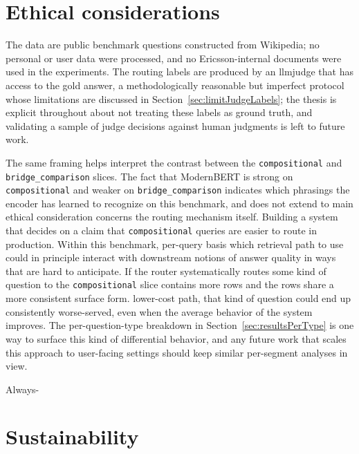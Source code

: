 \documentclass[english, bibtex]{kththesis}               %
\numberwithin{listing}{chapter}
\providecommand{\DIFaddtex}[1]{{\protect\color{blue} \sf #1}} %
\providecommand{\DIFdeltex}[1]{{\protect\color{red} \scriptsize #1}} %
\providecommand{\DIFaddbegin}{} %
\providecommand{\DIFaddend}{} %
\providecommand{\DIFdelbegin}{} %
\providecommand{\DIFdelend}{} %
\providecommand{\DIFadd}[1]{\texorpdfstring{\DIFaddtex{#1}}{#1}} %
\providecommand{\DIFdel}[1]{\texorpdfstring{\DIFdeltex{#1}}{}} %
\begin{document}
\section{Ethical considerations}
\label{sec:discEthics}
\label{sec:reflections}

\DIFadd{The data are public benchmark questions constructed from Wikipedia; no personal or user data were processed, and no Ericsson-internal documents were used in the experiments. The routing labels are produced by an \gls{llmjudge} that has access to the gold answer, a methodologically reasonable but imperfect protocol whose limitations are discussed in Section~\ref{sec:limitJudgeLabels}; the thesis is explicit throughout about not treating these labels as ground truth, and validating a sample of judge decisions against human judgments is left to future work}\DIFaddend .

The \DIFdelbegin \DIFdel{same framing helps interpret the contrast between the \texttt{compositional} and \texttt{bridge\_comparison} slices. The fact that ModernBERT is strong on \texttt{compositional} and weaker on \texttt{bridge\_comparison} indicates which phrasings the encoder has learned to recognize on this benchmark, and does not extend to }\DIFdelend \DIFaddbegin \DIFadd{main ethical consideration concerns the routing mechanism itself. Building a system that decides on }\DIFaddend a \DIFdelbegin \DIFdel{claim that \texttt{compositional} queries are easier to route in production. Within this benchmark, }\DIFdelend \DIFaddbegin \DIFadd{per-query basis which retrieval path to use could in principle interact with downstream notions of answer quality in ways that are hard to anticipate. If the router systematically routes some kind of question to }\DIFaddend the \DIFdelbegin \DIFdel{\texttt{compositional} slice contains more rows and the rows share a more consistent surface form. }\DIFdelend \DIFaddbegin \DIFadd{lower-cost path, that kind of question could end up consistently worse-served, even when the average behavior of the system improves. The per-question-type breakdown in Section~\ref{sec:resultsPerType} is one way to surface this kind of differential behavior, and any future work that scales this approach to user-facing settings should keep similar per-segment analyses in view.
}\DIFaddend 

\DIFdelbegin \DIFdel{Always-}\DIFdelend \DIFaddbegin \section{Sustainability}
\label{sec:discSustainability}
\end{document}
